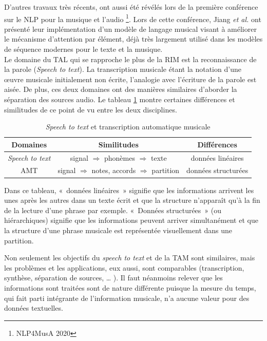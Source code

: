 D’autres travaux très récents, ont aussi été révélés lors de la première
conférence sur le NLP pour la musique et l’audio \footnote{NLP4MusA 2020}. Lors
de cette conférence, Jiang \textit{et al.} \cite{Jiang2020DiscoveringMR} ont
présenté leur implémentation d’un modèle de langage musical visant à améliorer
le mécanisme d’attention par élément, déjà très largement utilisé dans les
modèles de séquence modernes pour le texte et la musique.\\

Le domaine du TAL qui se rapproche le plus de la RIM est la reconnaissance de
la parole (\textit{Speech to text}). La transcription musicale étant la notation d’une
œuvre musicale initialement non écrite, l’analogie avec l’écriture de la parole
est aisée. De plus, ces deux domaines ont des manières similaires d’aborder
la séparation des sources audio. Le tableau \ref{spToTxt_vs_TAM} montre
certaines différences et similitudes de ce point de vu entre les deux
disciplines.

\begin{table}[h]
	\centering
	\begin{tabular}{|c|c|c|} \hline
	Domaines & Similitudes & Différences \\ \hline
	\textit{Speech to text} & signal $\Rightarrow$ phonèmes $\Rightarrow$
    texte & données linéaires \footnotemark\\
	AMT & signal $\Rightarrow$ notes, accords $\Rightarrow$ partition & données
    structurées\footnotemark\\ \hline
	\end{tabular}
	\caption{\textit{Speech to text} et transcription automatique musicale}
	\label{spToTxt_vs_TAM}
\end{table}
Dans ce tableau, «~données linéaires~» signifie que les informations arrivent
les unes après les autres dans un texte écrit et que la structure n’apparaît
qu’à la fin de la lecture d’une phrase par exemple. «~Données structurées~» (ou
hiérarchiques) signifie que les informations peuvent arriver simultanément et
que la structure d’une phrase musicale est représentée visuellement dans une
partition.

Non seulement les objectifs du \textit{speech to text} et de la TAM sont
similaires, mais les problèmes et les applications, eux aussi, sont comparables
(transcription, synthèse, séparation de sources, … ). Il faut néanmoins relever
que les informations sont traitées sont de nature différente puisque la mesure
du temps, qui fait parti intégrante de l’information musicale, n’a aucune
valeur pour des données textuelles.

